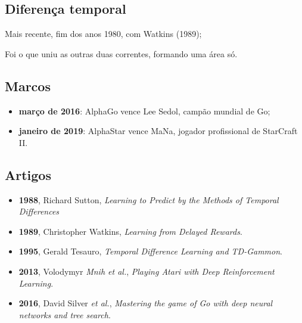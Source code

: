 \documentclass{article}
\begin{document}
        
        \subsection{Diferença temporal}
            Mais recente, fim dos anos 1980, com Watkins     (1989);
            
            Foi o que uniu as outras duas correntes, formando uma área só.
            
        \subsection{Marcos}
        
            \begin{itemize}
                \item \textbf{março de 2016}: AlphaGo vence Lee Sedol, campão mundial de Go;
                \item \textbf{janeiro de 2019}: AlphaStar vence MaNa, jogador profissional de StarCraft II.
            \end{itemize}
        
        \subsection{Artigos}
        
            \begin{itemize}
                \item \textbf{1988}, Richard Sutton, \textit{Learning to Predict by the Methods of Temporal Differences}
                \item \textbf{1989}, Christopher Watkins, \textit{Learning from Delayed Rewards}.
                \item \textbf{1995}, Gerald Tesauro, \textit{Temporal Difference Learning and TD-Gammon}.
                \item \textbf{2013}, Volodymyr \textit{Mnih et al.}, \textit{Playing Atari with Deep Reinforcement Learning}.
                \item \textbf{2016}, David Silver \textit{et al.}, \textit{Mastering the game of Go with deep neural networks and tree search}.
            \end{itemize}

    
\end{document}
